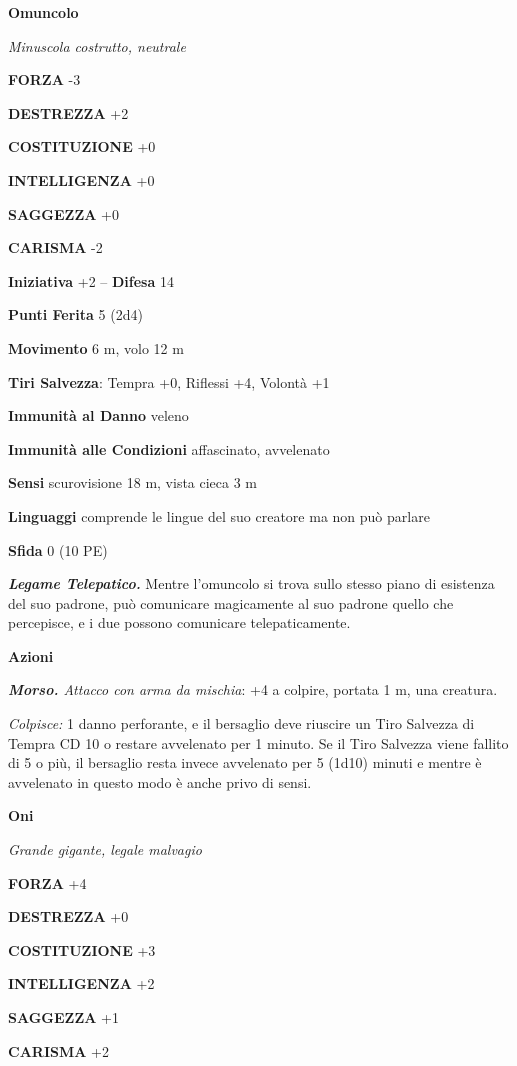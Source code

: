 \begin{multicols}{2}
\medskip{}\textbf{Omuncolo}

\emph{Minuscola costrutto, neutrale}

\textbf{FORZA} -3

\textbf{DESTREZZA} +2

\textbf{COSTITUZIONE} +0

\textbf{INTELLIGENZA} +0

\textbf{SAGGEZZA} +0

\textbf{CARISMA} -2

\textbf{Iniziativa} +2 -- \textbf{Difesa} 14

\textbf{Punti Ferita} 5 (2d4)

\textbf{Movimento} 6 m, volo 12 m

\textbf{Tiri Salvezza}:  Tempra +0, Riflessi +4, Volontà +1

\textbf{Immunità al Danno} veleno

\textbf{Immunità alle Condizioni} affascinato, avvelenato

\textbf{Sensi} scurovisione 18 m, vista cieca 3 m

\textbf{Linguaggi} comprende le lingue del suo creatore ma non può parlare

\textbf{Sfida} 0 (10 PE)

\emph{\textbf{Legame Telepatico.}} Mentre l'omuncolo si trova sullo stesso piano di esistenza del suo padrone, può comunicare magicamente al suo padrone quello che percepisce, e i due possono comunicare telepaticamente.

\textbf{Azioni}

\emph{\textbf{Morso.} Attacco con arma da mischia}: +4 a colpire, portata 1 m, una creatura.

\emph{Colpisce:} 1 danno perforante, e il bersaglio deve riuscire un Tiro Salvezza di Tempra CD 10 o restare avvelenato per 1 minuto. Se il Tiro Salvezza viene fallito di 5 o più, il bersaglio resta invece avvelenato per 5 (1d10) minuti e mentre è avvelenato in questo modo è anche privo di sensi.

\medskip{}\textbf{Oni}

\emph{Grande gigante, legale malvagio}

\textbf{FORZA} +4

\textbf{DESTREZZA} +0

\textbf{COSTITUZIONE} +3

\textbf{INTELLIGENZA} +2

\textbf{SAGGEZZA} +1

\textbf{CARISMA} +2


\end{multicols}
